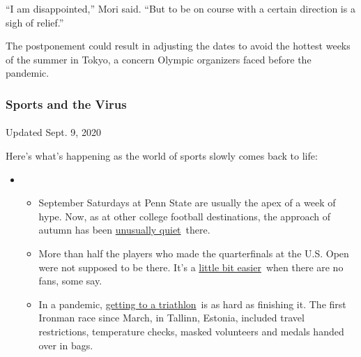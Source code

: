 ``I am disappointed,'' Mori said. ``But to be on course with a certain
direction is a sigh of relief.''

The postponement could result in adjusting the dates to avoid the
hottest weeks of the summer in Tokyo, a concern Olympic organizers faced
before the pandemic.

\hypertarget{sports-and-the-virus}{%
\subsubsection{Sports and the Virus}\label{sports-and-the-virus}}

\paragraph{}

Updated Sept. 9, 2020

Here's what's happening as the world of sports slowly comes back to
life:

\begin{itemize}
\item
  \begin{itemize}
  \tightlist
  \item
    September Saturdays at Penn State are usually the apex of a week of
    hype. Now, as at other college football destinations, the approach
    of autumn has been
    \href{https://www.nytimes3xbfgragh.onion/2020/09/09/sports/penn-state-college-football-canceled.html?action=click\&pgtype=Article\&state=default\&region=MAIN_CONTENT_2\&context=storylines_keepup}{unusually
    quiet}~there.
  \item
    More than half the players who made the quarterfinals at the U.S.
    Open were not supposed to be there. It's a
    \href{https://www.nytimes3xbfgragh.onion/2020/09/09/sports/us-open-crowd.html?action=click\&pgtype=Article\&state=default\&region=MAIN_CONTENT_2\&context=storylines_keepup}{little
    bit easier}~when there are no fans, some say.
  \item
    In a pandemic,
    \href{https://www.nytimes3xbfgragh.onion/2020/09/08/sports/ironman-tallinn-triathlon-pandemic.html?action=click\&pgtype=Article\&state=default\&region=MAIN_CONTENT_2\&context=storylines_keepup}{getting
    to a triathlon}~is as hard as finishing it. The first Ironman race
    since March, in Tallinn, Estonia, included travel restrictions,
    temperature checks, masked volunteers and medals handed over in
    bags.
  \end{itemize}
\end{itemize}

